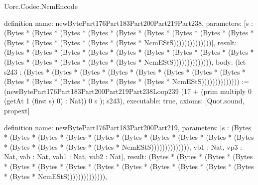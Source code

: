 \begin{lexlean}{Uorc.Codec.NcmEncode}
\begin{semanticmodule}
definition{
  name: newBytePart176Part183Part200Part219Part238,
  parameters: [s : (Bytes * (Bytes * (Bytes * (Bytes * (Bytes * (Bytes * (Bytes * (Bytes * (Bytes * (Bytes * (Bytes * (Bytes * (Bytes * (Bytes * NcmEStS))))))))))))))],
  result: (Bytes * (Bytes * (Bytes * (Bytes * (Bytes * (Bytes * (Bytes * (Bytes * (Bytes * (Bytes * (Bytes * (Bytes * (Bytes * (Bytes * NcmEStS)))))))))))))),
  body: (let s243 : (Bytes * (Bytes * (Bytes * (Bytes * (Bytes * (Bytes * (Bytes * (Bytes * (Bytes * (Bytes * (Bytes * (Bytes * (Bytes * (Bytes * NcmEStS)))))))))))))) := (newBytePart176Part183Part200Part219Part238Loop239 (17 + (prim multiply 0 (getAt 1 (first s) 0) : Nat)) 0 s ); s243),
  executable: true,
  axioms: [Quot.sound, propext]
}

definition{
  name: newBytePart176Part183Part200Part219,
  parameters: [s : (Bytes * (Bytes * (Bytes * (Bytes * (Bytes * (Bytes * (Bytes * (Bytes * (Bytes * (Bytes * (Bytes * (Bytes * (Bytes * (Bytes * NcmEStS)))))))))))))), vb1 : Nat, vp3 : Nat, vab : Nat, vab1 : Nat, vab2 : Nat],
  result: (Bytes * (Bytes * (Bytes * (Bytes * (Bytes * (Bytes * (Bytes * (Bytes * (Bytes * (Bytes * (Bytes * (Bytes * (Bytes * (Bytes * NcmEStS)))))))))))))),
}
\end{semanticmodule}
\end{lexlean}
